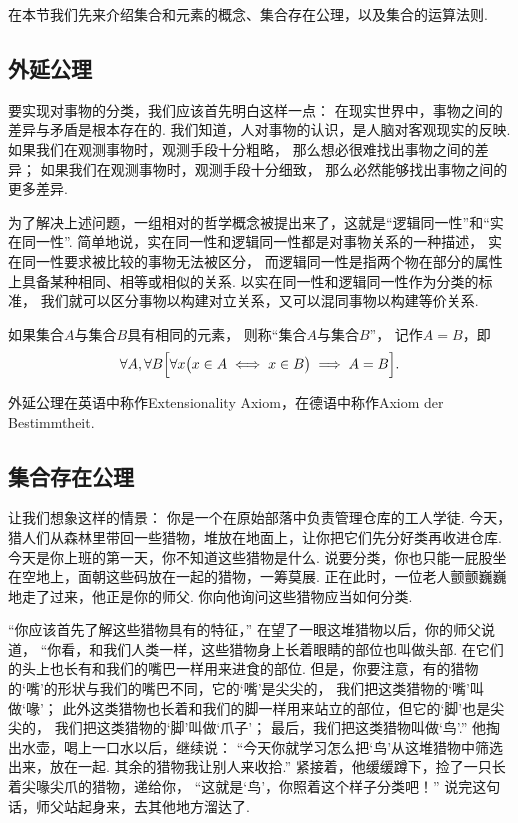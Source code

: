 在本节我们先来介绍集合和元素的概念、集合存在公理，以及集合的运算法则.

\subsection{外延公理}
要实现对事物的分类，我们应该首先明白这样一点：
在现实世界中，事物之间的差异与矛盾是根本存在的.
我们知道，人对事物的认识，是人脑对客观现实的反映.
如果我们在观测事物时，观测手段十分粗略，
那么想必很难找出事物之间的差异；
如果我们在观测事物时，观测手段十分细致，
那么必然能够找出事物之间的更多差异.

为了解决上述问题，一组相对的哲学概念被提出来了，这就是“逻辑同一性”和“实在同一性”.
简单地说，实在同一性和逻辑同一性都是对事物关系的一种描述，
实在同一性要求被比较的事物无法被区分，
而逻辑同一性是指两个物在部分的属性上具备某种相同、相等或相似的关系.
以实在同一性和逻辑同一性作为分类的标准，
我们就可以区分事物以构建对立关系，又可以混同事物以构建等价关系.


\begin{axiom}[外延公理]
如果集合\(A\)与集合\(B\)具有相同的元素，
则称“集合\(A\)与集合\(B\)”，
记作\(A=B\)，即\[
	\forall A, \forall B \Bigl[
		\forall x \bigl( x \in A \iff x \in B \bigr)
		\implies A = B
	\Bigr].
\]
\end{axiom}
外延公理在英语中称作Extensionality Axiom，在德语中称作Axiom der Bestimmtheit.


\subsection{集合存在公理}
让我们想象这样的情景：
你是一个在原始部落中负责管理仓库的工人学徒.
今天，猎人们从森林里带回一些猎物，堆放在地面上，让你把它们先分好类再收进仓库.
今天是你上班的第一天，你不知道这些猎物是什么.
说要分类，你也只能一屁股坐在空地上，面朝这些码放在一起的猎物，一筹莫展.
正在此时，一位老人颤颤巍巍地走了过来，他正是你的师父.
你向他询问这些猎物应当如何分类.

“你应该首先了解这些猎物具有的特征，”
在望了一眼这堆猎物以后，你的师父说道，
“你看，和我们人类一样，这些猎物身上长着眼睛的部位也叫做头部.
在它们的头上也长有和我们的嘴巴一样用来进食的部位.
但是，你要注意，有的猎物的‘嘴’的形状与我们的嘴巴不同，它的‘嘴’是尖尖的，
我们把这类猎物的‘嘴’叫做‘喙’；
此外这类猎物也长着和我们的脚一样用来站立的部位，但它的‘脚’也是尖尖的，
我们把这类猎物的‘脚’叫做‘爪子’；
最后，我们把这类猎物叫做‘鸟’.”
他掏出水壶，喝上一口水以后，继续说：
“今天你就学习怎么把‘鸟’从这堆猎物中筛选出来，放在一起.
其余的猎物我让别人来收拾.”
紧接着，他缓缓蹲下，捡了一只长着尖喙尖爪的猎物，递给你，
“这就是‘鸟’，你照着这个样子分类吧！”
说完这句话，师父站起身来，去其他地方溜达了.

